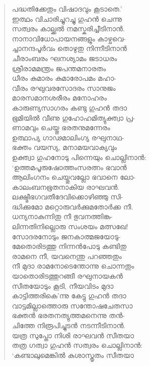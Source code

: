 \begin{verse}
പദ്ധതിക്കേതും വിഷാദവും കൂടാതെ.’\\
ഇത്ഥം വിചാരിച്ചുറച്ചു ഗുഹന്‍ ചെന്നു\\
സത്വരം കാല്ക്കല്‍ നമസ്കരിച്ചീടിനാന്‍.\\
നാനാവിധോപായനങ്ങളും കാഴ്ചവെ-\\
ച്ചാനന്ദപൂര്‍വം തൊഴുതു നിന്നീടിനാന്‍\\
ചീരാംബരം ഘനശ്യാമം ജടാധരം\\
ശ്രീരാമമന്ത്രം ജപന്തമനാരതം\\
ധീരം കുമാരം കുമാരോപമം മഹാ-\\
വീരം രഘുവരസോദരം സാനുജം\\
മാരസമാനശരീരം മനോഹരം\\
കാരുണ്യസാഗരം കണ്ടു ഗുഹന്‍ തദാ\\
ഭൂമിയില്‍ വീണു ഗുഹോഹമിത്യുക്ത്വാ പ്ര-\\
ണാമവും ചെയ്തു ഭരതനുമന്നേരം\\
ഉത്ഥാപ്യ ഗാഢമാലിംഗ്യ രഘുനാഥ-\\
ഭക്തം വയസ്യ, മനാമയവാക്യവും\\
ഉക്ത്വാ ഗുഹനോടു പിന്നെയും ചൊല്ലിനാന്‍:\\
‘ഉത്തമപൂരുഷോത്തംസരത്നം ഭവാന്‍\\
ആലിംഗനം ചെയ്തുവല്ലോ ഭവാനെ ലോ-\\
കാലംബനഭൂതനാകിയ രാഘവന്‍.\\
ലക്ഷ്മീഭഗവതീദേവിക്കൊഴിഞ്ഞു സി-\\
ദ്ധിക്കുമോ മറ്റൊരുവര്‍ക്കുമതോര്‍ക്ക നീ.\\
ധന്യനാകുന്നിതു നീ ഭുവനത്തിങ്ക-\\
ലിന്നതിനില്ലൊരു സംശയം മത്സഖേ!\\
സോദരനോടും ജനകാത്മജയോടു-\\
മേതൊരിടത്തു നിന്നന്‍പോടു കണ്ടിതു\\
രാമനെ നീ, യവനെന്തു പറഞ്ഞതും\\
നീ മുദാ രാമനോടെന്തോന്നു ചൊന്നതും\\
യാതൊരിടത്തുറങ്ങീ രഘുനായകന്‍\\
സീതയോടും കൂടി, നീയവിടം മുദാ\\
കാട്ടിത്തരികെ’ന്നു കേട്ടു ഗുഹന്‍ തദാ\\
വാട്ടമില്ലാത്തൊരു സന്തോഷചേതസാ\\
ഭക്തന്‍ ഭരതനത്യുത്തമനെന്നു തന്‍-\\
ചിത്തേ നിരൂപിച്ചുടന്‍ നടന്നീടിനാന്‍.\\
യത്ര സുപ്തോ നിശി രാഘവന്‍ സീതയാ\\
തത്ര ഗത്വാ ഗുഹന്‍ സത്വരം ചൊല്ലിനാന്‍:\\
‘കണ്ടാലുമെങ്കില്‍ കുശാസ്തൃതം സീതയാ\\

\end{verse}
